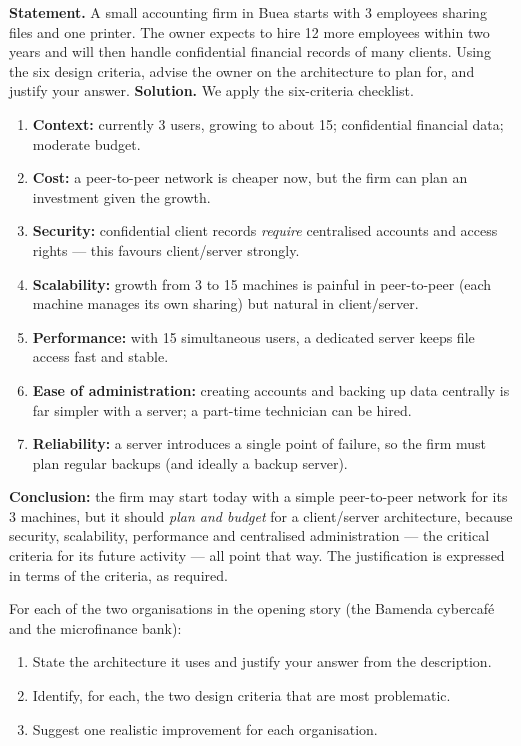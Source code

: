 \documentclass[11pt]{article}
\newcounter{popsec}
\newcounter{popsub}
\newcommand{\courssub}[1]{%
  \stepcounter{popsub}%
  \par\vspace{9pt}\noindent{\popxbold\fontsize{11.5}{13}\selectfont\color{popink}{\color{poporange}\thepopsec.\thepopsub}\hspace{6pt}#1}\par\nopagebreak\vspace{4pt}
}
\begin{document}
\courssub{Worked Example and Consolidation}

\begin{exoresolu}
\textbf{Statement.} A small accounting firm in Buea starts with 3 employees sharing files and one printer. The owner expects to hire 12 more employees within two years and will then handle confidential financial records of many clients. Using the six design criteria, advise the owner on the architecture to plan for, and justify your answer.
\tcblower
\textbf{Solution.} We apply the six-criteria checklist.
\begin{enumerate}
\item \textbf{Context:} currently 3 users, growing to about 15; confidential financial data; moderate budget.
\item \textbf{Cost:} a peer-to-peer network is cheaper now, but the firm can plan an investment given the growth.
\item \textbf{Security:} confidential client records \emph{require} centralised accounts and access rights --- this favours client/server strongly.
\item \textbf{Scalability:} growth from 3 to 15 machines is painful in peer-to-peer (each machine manages its own sharing) but natural in client/server.
\item \textbf{Performance:} with 15 simultaneous users, a dedicated server keeps file access fast and stable.
\item \textbf{Ease of administration:} creating accounts and backing up data centrally is far simpler with a server; a part-time technician can be hired.
\item \textbf{Reliability:} a server introduces a single point of failure, so the firm must plan regular backups (and ideally a backup server).
\end{enumerate}
\textbf{Conclusion:} the firm may start today with a simple peer-to-peer network for its 3 machines, but it should \emph{plan and budget} for a client/server architecture, because security, scalability, performance and centralised administration --- the critical criteria for its future activity --- all point that way. The justification is expressed in terms of the criteria, as required.
\end{exoresolu}

\begin{exercice}
For each of the two organisations in the opening story (the Bamenda cybercafé and the microfinance bank):
\begin{enumerate}
\item State the architecture it uses and justify your answer from the description.
\item Identify, for each, the two design criteria that are most problematic.
\item Suggest one realistic improvement for each organisation.
\end{enumerate}
\end{exercice}
\end{document}
